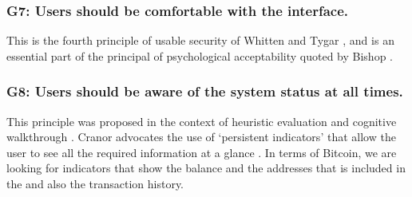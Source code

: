 \subsubsection*{G7: Users should be comfortable with the interface.} This is the fourth principle of usable security of Whitten and Tygar \cite{johnny}, and is an essential part of the principal of psychological acceptability quoted by Bishop \cite{pa}. 


\subsubsection*{G8: Users should be aware of the system status at all times.} This principle was proposed in the context of heuristic evaluation \cite{cw} and cognitive walkthrough \cite{pvo}. Cranor advocates the use of `persistent indicators' that allow the user to see all the required information at a glance \cite{p3p}. In terms of Bitcoin, we are looking for indicators that show the balance and the addresses that is included in the \walletfile and also the transaction history.


